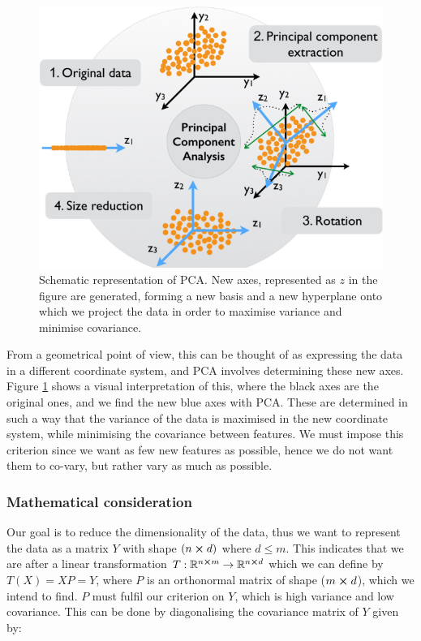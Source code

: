         \begin{figure}
            \includegraphics[width=\linewidth]{figs/pca_schematic.png}
            \caption{Schematic representation of PCA. New axes, represented as $z$ in the figure are generated, forming a new basis and a new hyperplane onto which we project the data in order to maximise variance and minimise covariance.\citep{pca_img}}
            \label{theo:fig:pca_schematic}
        \end{figure}
        
        From a geometrical point of view, this can be thought of as expressing the data in a different coordinate system, and PCA involves determining these new axes. Figure \ref{theo:fig:pca_schematic}  shows a visual interpretation of this, where the black axes are the original ones, and we find the new blue axes with PCA. These are determined in such a way that the variance of the data is maximised in the new coordinate system, while minimising the covariance between features. We must impose this criterion since we want as few new features as possible, hence we do not want them to co-vary, but rather vary as much as possible. 

    \subsubsection{Mathematical consideration}

    Our goal is to reduce the dimensionality of the data, thus we want to represent the data as a matrix $Y$ with shape $(n\cross d)$ where $d\leq m$. This indicates that we are after a linear transformation $T:\mathbb{R}^{n\cross m} \to \mathbb{R}^{n\cross d}$ which we can define by $T(X) = XP = Y$, where $P$ is an orthonormal matrix of shape ($m\cross d$), which we intend to find. $P$ must fulfil our criterion on $Y$, which is high variance and low covariance. This can be done by diagonalising the covariance matrix of $Y$ given by:

